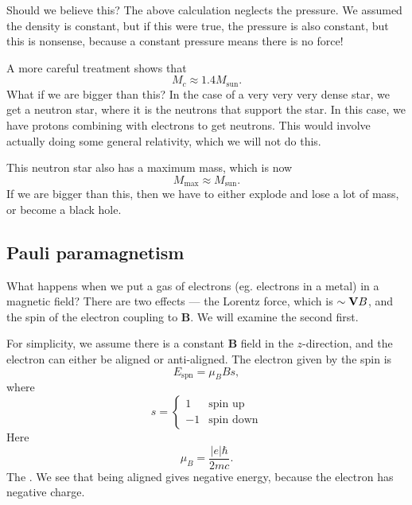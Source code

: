 \documentclass[a4paper]{article}
\begin{document}
Should we believe this? The above calculation neglects the pressure. We assumed the density is constant, but if this were true, the pressure is also constant, but this is nonsense, because a constant pressure means there is no force!

A more careful treatment shows that
\[
  M_c \approx 1.4 M_{\mathrm{sun}}.
\]
What if we are bigger than this? In the case of a very very very dense star, we get a neutron star, where it is the neutrons that support the star. In this case, we have protons combining with electrons to get neutrons. This would involve actually doing some general relativity, which we will not do this.

This neutron star also has a maximum mass, which is now
\[
  M_{\mathrm{max}} \approx M_{\mathrm{sun}}.
\]
If we are bigger than this, then we have to either explode and lose a lot of mass, or become a black hole.

\subsection{Pauli paramagnetism}
What happens when we put a gas of electrons (eg. electrons in a metal) in a magnetic field? There are two effects --- the Lorentz force, which is $\sim \mathbf{V}\mathbf \mathbf{B}$, and the spin of the electron coupling to $\mathbf{B}$. We will examine the second first.

For simplicity, we assume there is a constant $\mathbf{B}$ field in the $z$-direction, and the electron can either be aligned or anti-aligned. The electron given by the spin is
\[
  E_{\mathrm{spn}} = \mu_B B s,
\]
where
\[
  s =
  \begin{cases}
    1 & \text{spin up}\\
    -1 & \text{spin down}
  \end{cases}
\]
Here
\[
  \mu_B = \frac{|e| \hbar}{2mc}.
\]
The . We see that being aligned gives negative energy, because the electron has negative charge.
\end{document}
